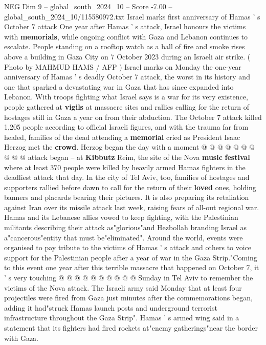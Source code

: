 \begin{textsample}{NEG Dim 9 – global\_south\_2024\_10 – Score -7.00 – global\_south\_2024\_10/115580972.txt}  \label{ex:f9_neg_273}
Israel marks first anniversary of Hamas ' s October 7 attack One year after Hamas ' s attack, Israel honours the victims with \textbf{memorials}, while ongoing conflict with Gaza and Lebanon continues to escalate.
People standing on a rooftop watch as a ball of fire and smoke rises above a building in Gaza City on 7 October 2023 during an Israeli air strike. ( Photo by MAHMUD HAMS / AFP ) Israel marks on Monday the one-year anniversary of Hamas ' s deadly October 7 attack, the worst in its history and one that sparked a devastating war in Gaza that has since expanded into Lebanon.
With troops fighting what Israel says is a war for its very existence, people gathered at \textbf{vigils} at massacre sites and rallies calling for the return of hostages still in Gaza a year on from their abduction.
The October 7 attack killed 1,205 people according to official Israeli figures, and with the trauma far from healed, families of the dead attending a \textbf{memorial} cried as President Isaac Herzog met the \textbf{crowd}.
Herzog began the day with a moment @ @ @ @ @ @ @ @ @ @ attack began -- at \textbf{Kibbutz} Reim, the site of the Nova \textbf{music} \textbf{festival} where at least 370 people were killed by heavily armed Hamas fighters in the deadliest attack that day.
In the city of Tel Aviv, too, families of hostages and supporters rallied before dawn to call for the return of their \textbf{loved} ones, holding banners and placards bearing their pictures.
It is also preparing its retaliation against Iran over its missile attack last week, raising fears of all-out regional war.
Hamas and its Lebanese allies vowed to keep fighting, with the Palestinian militants describing their attack as"glorious"and Hezbollah branding Israel as a"cancerous"entity that must be"eliminated".
Around the world, events were organised to pay tribute to the victims of Hamas ' s attack and others to voice support for the Palestinian people after a year of war in the Gaza Strip."Coming to this event one year after this terrible massacre that happened on October 7, it ' s very touching @ @ @ @ @ @ @ @ @ @ Sunday in Tel Aviv to remember the victims of the Nova attack.
The Israeli army said Monday that at least four projectiles were fired from Gaza just minutes after the commemorations began, adding it had"struck Hamas launch posts and underground terrorist infrastructure throughout the Gaza Strip".
Hamas ' s armed wing said in a statement that its fighters had fired rockets at"enemy gatherings"near the border with Gaza.

\end{textsample}
